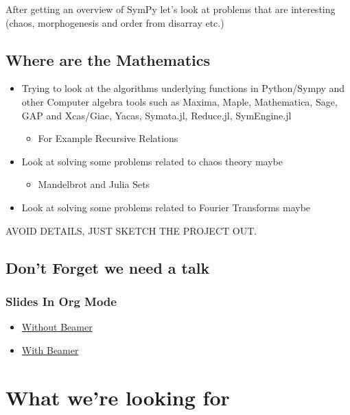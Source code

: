 \documentclass[11pt]{article}
\begin{document}
After getting an overview of SymPy let's look at problems that are interesting (chaos, morphogenesis and order from disarray etc.)


\subsection{Where are the Mathematics}
\label{sec:org55da4e2}

\begin{itemize}
\item Trying to look at the algorithms underlying functions in Python/Sympy and other Computer algebra tools such as Maxima, Maple, Mathematica, Sage, GAP and Xcas/Giac, Yacas, Symata.jl, Reduce.jl, SymEngine.jl
\begin{itemize}
\item For Example Recursive Relations
\end{itemize}
\item Look at solving some problems related to chaos theory maybe
\begin{itemize}
\item Mandelbrot and Julia Sets
\end{itemize}
\item Look at solving some problems related to Fourier Transforms maybe
\end{itemize}


AVOID DETAILS, JUST SKETCH THE PROJECT OUT.


\subsection{Don't Forget we need a talk}
\label{sec:org87ed653}
\subsubsection{Slides In Org Mode}
\label{sec:org27f2a0a}
\begin{itemize}
\item \href{https://orgmode.org/worg/org-tutorials/non-beamer-presentations.html}{Without Beamer}
\item \href{https://orgmode.org/worg/exporters/beamer/tutorial.html}{With Beamer}
\end{itemize}

\section{What we're looking for}
\label{sec:orgbf0050f}
\end{document}
